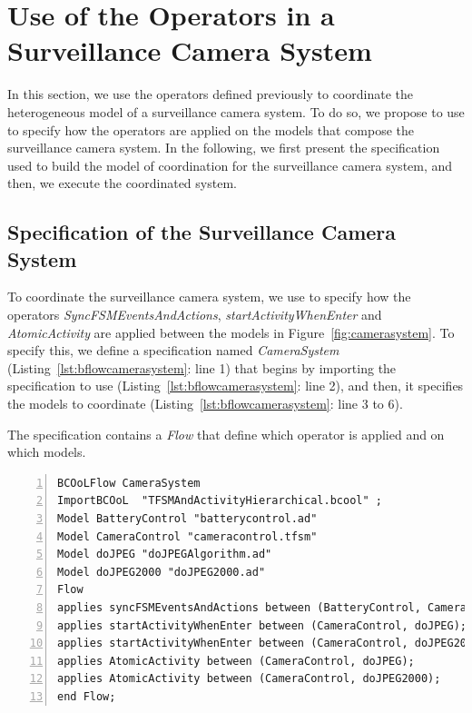 \section{Use of the Operators in a Surveillance Camera System}
In this section, we use the operators defined previously to coordinate the heterogeneous model of a surveillance camera system. To do so, we propose to use \bflow to specify how the operators are applied on the models that compose the surveillance camera system. In the following, we first present the \bflow specification used to build the model of coordination for the surveillance camera system, and then, we execute the coordinated system. 

\subsection{\bflow Specification of the Surveillance Camera System}
To coordinate the surveillance camera system, we use \bflow to specify how the operators \emph{SyncFSMEventsAndActions}, \emph{startActivityWhenEnter} and \emph{AtomicActivity} are applied between the models in Figure~\ref{fig:camerasystem}. To specify this, we define a \bflow specification named \emph{CameraSystem} (Listing~\ref{lst:bflowcamerasystem}: line 1) that begins by importing the \bcool specification to use (Listing~\ref{lst:bflowcamerasystem}: line 2), and then, it specifies the models to coordinate (Listing~\ref{lst:bflowcamerasystem}: line 3 to 6).

The specification contains a \emph{Flow} that define which operator is applied and on which models.

\begin{lstlisting}[language=bflow,
caption={\bflow specification for the Surveillance Camera System},
label={lst:bflowcamerasystem}, 
basicstyle=\scriptsize\ttfamily, backgroundcolor=\color{LGrey}, numbers=left, xleftmargin=2pt]
BCOoLFlow CameraSystem
ImportBCOoL  "TFSMAndActivityHierarchical.bcool" ;
Model BatteryControl "batterycontrol.ad"
Model CameraControl "cameracontrol.tfsm"
Model doJPEG "doJPEGAlgorithm.ad"
Model doJPEG2000 "doJPEG2000.ad"
Flow 
applies syncFSMEventsAndActions between (BatteryControl, CameraControl);
applies startActivityWhenEnter between (CameraControl, doJPEG);
applies startActivityWhenEnter between (CameraControl, doJPEG2000);
applies AtomicActivity between (CameraControl, doJPEG);		
applies AtomicActivity between (CameraControl, doJPEG2000);		
end Flow;
\end{lstlisting}


